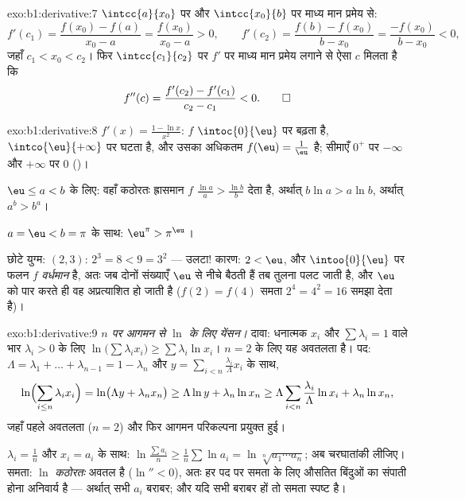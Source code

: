 \begin{solution}{exo:b1:derivative:7}
$\intcc{a}{x_0}$ पर और $\intcc{x_0}{b}$ पर माध्य मान प्रमेय से:
\[
f'(c_1) = \frac{f(x_0) - f(a)}{x_0 - a} = \frac{f(x_0)}{x_0 - a} > 0,
\qquad
f'(c_2) = \frac{f(b) - f(x_0)}{b - x_0} = \frac{-f(x_0)}{b - x_0} < 0,
\]
जहाँ $c_1 < x_0 < c_2$। फिर $\intcc{c_1}{c_2}$ पर $f'$ पर माध्य मान प्रमेय
लगाने से ऐसा $c$ मिलता है कि
\[
f''(c) = \frac{f'(c_2) - f'(c_1)}{c_2 - c_1} < 0 . \qedhere
\]
\end{solution}

\begin{solution}{exo:b1:derivative:8}
$f'(x) = \frac{1 - \ln x}{x^2}$: $f$ $\intoc{0}{\eu}$ पर बढ़ता है,
$\intco{\eu}{+\infty}$ पर घटता है, और उसका अधिकतम $f(\eu) = \frac1\eu$ है;
सीमाएँ $0^+$ पर $-\infty$ और $+\infty$ पर $0$ ()।

$\eu \leq a < b$ के लिए: वहाँ कठोरतः ह्रासमान $f$ $\frac{\ln a}{a} >
\frac{\ln b}{b}$ देता है, अर्थात् $b \ln a > a \ln b$, अर्थात् $a^b > b^a$।

$a = \eu < b = \pi$ के साथ: $\eu^\pi > \pi^\eu$।

छोटे युग्म: $(2, 3)$: $2^3 = 8 < 9 = 3^2$ --- उलटा! कारण: $2 < \eu$, और
$\intoo{0}{\eu}$ पर फलन $f$ \emph{वर्धमान} है, अतः जब दोनों संख्याएँ $\eu$
से नीचे बैठती हैं तब तुलना पलट जाती है, और $\eu$ को पार करते ही वह
अप्रत्याशित हो जाती है ($f(2) = f(4)$ समता $2^4 = 4^2 = 16$ समझा देता है)।
\end{solution}

\begin{solution}{exo:b1:derivative:9}
\emph{$n$ पर आगमन से $\ln$ के लिए येंसन।} दावा: धनात्मक $x_i$ और $\sum
\lambda_i = 1$ वाले भार $\lambda_i > 0$ के लिए $\ln\bigl(\sum \lambda_i
x_i\bigr) \geq \sum \lambda_i \ln x_i$। $n = 2$ के लिए यह अवतलता है। पद:
$\Lambda = \lambda_1 + \dots + \lambda_{n-1} = 1 - \lambda_n$ और $y =
\sum_{i<n} \frac{\lambda_i}{\Lambda} x_i$ के साथ,
\[
\ln\Bigl(\sum_{i \leq n} \lambda_i x_i\Bigr)
= \ln\bigl(\Lambda y + \lambda_n x_n\bigr)
\geq \Lambda \ln y + \lambda_n \ln x_n
\geq \Lambda \sum_{i<n} \frac{\lambda_i}{\Lambda}\ln x_i
+ \lambda_n \ln x_n,
\]
जहाँ पहले अवतलता ($n = 2$) और फिर आगमन परिकल्पना प्रयुक्त हुई।

$\lambda_i = \frac 1n$ और $x_i = a_i$ के साथ: $\ln\frac{\sum a_i}{n} \geq
\frac 1n \sum \ln a_i = \ln\sqrt[n]{a_1\cdots a_n}$; अब चरघातांकी लीजिए।
समता: $\ln$ \emph{कठोरतः} अवतल है ($\ln'' < 0$), अतः हर पद पर समता के लिए
औसतित बिंदुओं का संपाती होना अनिवार्य है --- अर्थात् सभी $a_i$ बराबर; और यदि
सभी बराबर हों तो समता स्पष्ट है।
\end{solution}

